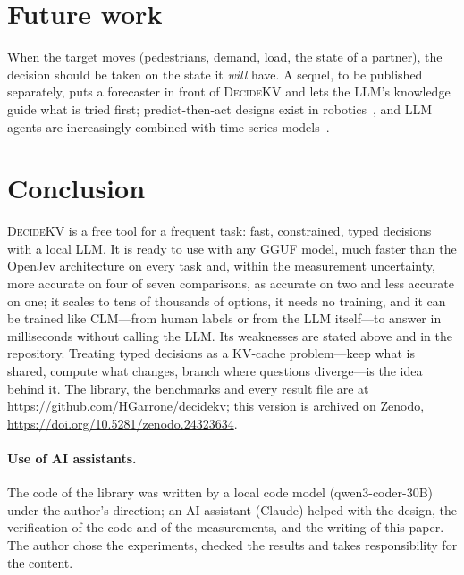 \documentclass[11pt]{article}
\newcommand{\dkv}{\textsc{DecideKV}}
\begin{document}
\section{Future work}
When the target moves (pedestrians, demand, load, the state of a partner), the decision should be taken on the state it
\emph{will} have. A sequel, to be published separately, puts a forecaster in front of \dkv{} and lets the LLM's
knowledge guide what is tried first; predict-then-act designs exist in robotics~\citep{ahead}, and LLM agents are
increasingly combined with time-series models~\citep{tsagents}.

\section{Conclusion}
\dkv{} is a free tool for a frequent task: fast, constrained, typed decisions with a local LLM. It is ready to use
with any GGUF model, much faster than the OpenJev architecture on every task and, within the measurement
uncertainty, more accurate on four of seven comparisons, as accurate on two and less accurate on one; it scales to tens of thousands of options, it needs no training, and it can be trained
like CLM---from human labels or from the LLM itself---to answer in milliseconds without calling the LLM. Its weaknesses
are stated above and in the repository. Treating typed decisions as a KV-cache problem---keep what is shared, compute
what changes, branch where questions diverge---is the idea behind it. The library, the benchmarks and every result file
are at \url{https://github.com/HGarrone/decidekv}; this version is archived on Zenodo, \url{https://doi.org/10.5281/zenodo.24323634}.

\paragraph{Use of AI assistants.} The code of the library was written by a local code model (qwen3-coder-30B) under
the author's direction; an AI assistant (Claude) helped with the design, the verification of the code and of the
measurements, and the writing of this paper. The author chose the experiments, checked the results and takes
responsibility for the content.



\end{document}
